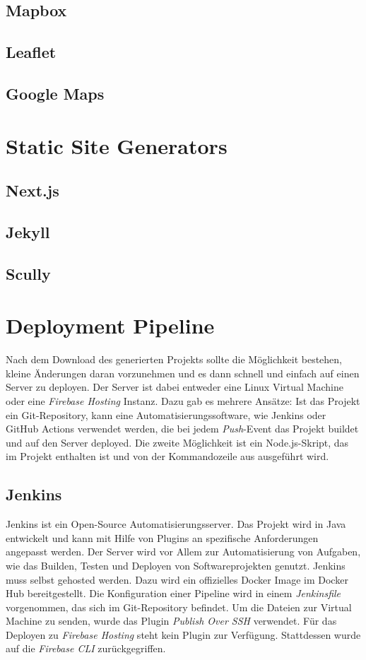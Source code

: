 \subsection{Mapbox}
\subsection{Leaflet}
\subsection{Google Maps}

\section{Static Site Generators}
\subsection{Next.js}
\subsection{Jekyll}
\subsection{Scully}

\section{Deployment Pipeline}
Nach dem Download des generierten Projekts sollte die Möglichkeit bestehen,
kleine Änderungen daran vorzunehmen und es dann schnell und einfach auf einen
Server zu deployen. Der Server ist dabei entweder eine Linux Virtual Machine
oder eine \textit{Firebase Hosting} Instanz.
Dazu gab es mehrere Ansätze: Ist das Projekt ein Git-Repository, kann eine
Automatisierungssoftware, wie Jenkins oder GitHub Actions verwendet werden,
die bei jedem \textit{Push}-Event das Projekt buildet und auf den Server
deployed. Die zweite Möglichkeit ist ein Node.js-Skript, das im Projekt
enthalten ist und von der Kommandozeile aus ausgeführt wird.
\subsection{Jenkins}
Jenkins ist ein Open-Source Automatisierungsserver. Das Projekt wird in
Java entwickelt und kann mit Hilfe von Plugins an spezifische Anforderungen
angepasst werden.
Der Server wird vor Allem zur Automatisierung von Aufgaben, wie das Builden,
Testen und Deployen von Softwareprojekten genutzt.
Jenkins muss selbst gehosted werden. Dazu wird ein offizielles Docker Image
im Docker Hub bereitgestellt.
Die Konfiguration einer Pipeline wird in einem \textit{Jenkinsfile} vorgenommen,
das sich im Git-Repository befindet.
Um die Dateien zur Virtual Machine zu senden, wurde das Plugin \textit{Publish Over SSH}
verwendet. Für das Deployen zu \textit{Firebase Hosting} steht kein Plugin zur
Verfügung. Stattdessen wurde auf die \textit{Firebase CLI} zurückgegriffen.


